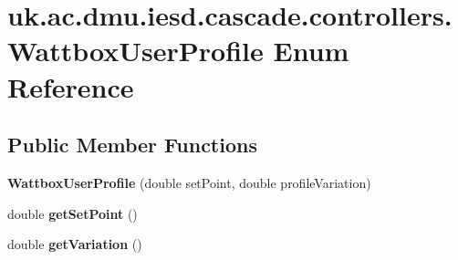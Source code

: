 \hypertarget{enumuk_1_1ac_1_1dmu_1_1iesd_1_1cascade_1_1controllers_1_1_wattbox_user_profile}{\section{uk.\-ac.\-dmu.\-iesd.\-cascade.\-controllers.\-Wattbox\-User\-Profile Enum Reference}
\label{enumuk_1_1ac_1_1dmu_1_1iesd_1_1cascade_1_1controllers_1_1_wattbox_user_profile}
}
\subsection*{Public Member Functions}
\begin{DoxyCompactItemize}
\item 
\hypertarget{enumuk_1_1ac_1_1dmu_1_1iesd_1_1cascade_1_1controllers_1_1_wattbox_user_profile_abf7292ffb54f65e8ef9ce9e05a53e619}{{\bfseries Wattbox\-User\-Profile} (double set\-Point, double profile\-Variation)}\label{enumuk_1_1ac_1_1dmu_1_1iesd_1_1cascade_1_1controllers_1_1_wattbox_user_profile_abf7292ffb54f65e8ef9ce9e05a53e619}

\item 
\hypertarget{enumuk_1_1ac_1_1dmu_1_1iesd_1_1cascade_1_1controllers_1_1_wattbox_user_profile_a9eebfdd3da2ede17ab34e9e2a5e43c3a}{double {\bfseries get\-Set\-Point} ()}\label{enumuk_1_1ac_1_1dmu_1_1iesd_1_1cascade_1_1controllers_1_1_wattbox_user_profile_a9eebfdd3da2ede17ab34e9e2a5e43c3a}

\item 
\hypertarget{enumuk_1_1ac_1_1dmu_1_1iesd_1_1cascade_1_1controllers_1_1_wattbox_user_profile_a784ea713fa10cb4df98a0d39454c78fe}{double {\bfseries get\-Variation} ()}\label{enumuk_1_1ac_1_1dmu_1_1iesd_1_1cascade_1_1controllers_1_1_wattbox_user_profile_a784ea713fa10cb4df98a0d39454c78fe}

\end{DoxyCompactItemize}
